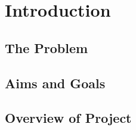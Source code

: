 \section{Introduction}

\subsection{The Problem}

\subsection{Aims and Goals}

\subsection{Overview of Project}
